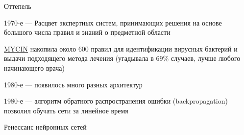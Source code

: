 \documentclass[notes,12pt, aspectratio=169]{beamer}
\newenvironment{wideitemize}{\itemize\addtolength{\itemsep}{10pt}}{\enditemize}
\begin{document}
\begin{frame}{Оттепель}
	\begin{wideitemize} 
		\item 1970-е — Расцвет экспертных систем, принимающих решения на основе большого числа правил и знаний о предметной области 
		
		\item {\color{blue} \href{https://en.wikipedia.org/wiki/Mycin}{MYCIN}} накопила около $600$ правил для идентификации вирусных бактерий и выдачи подходящего метода лечения (угадывала в $69\%$ случаев, лучше любого начинающего врача)
		
		\item 1980-е  — появилось много разных архитектур
		
		\item 1980-е — алгоритм обратного распространения ошибки (backpropagation) позволил обучать сети за линейное время
		
		\item Ренессанс нейронных сетей 
	\end{wideitemize} 
\end{frame}
\end{document}
